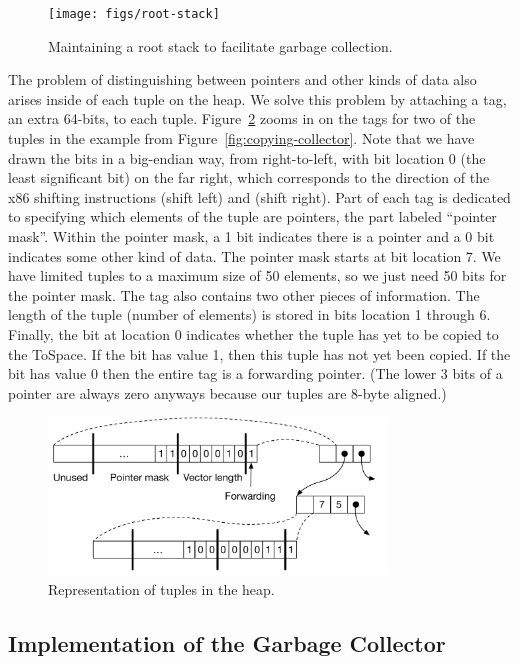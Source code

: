 \documentclass[11pt]{book}
\begin{document}
\begin{figure}[tbp]
\centering \texttt{[image: figs/root-stack]}
\caption{Maintaining a root stack to facilitate garbage collection.}
\label{fig:shadow-stack}
\end{figure}

The problem of distinguishing between pointers and other kinds of data
also arises inside of each tuple on the heap. We solve this problem by
attaching a tag, an extra 64-bits, to each
tuple. Figure~\ref{fig:tuple-rep} zooms in on the tags for two of the
tuples in the example from Figure~\ref{fig:copying-collector}. Note
that we have drawn the bits in a big-endian way, from right-to-left,
with bit location 0 (the least significant bit) on the far right,
which corresponds to the direction of the x86 shifting instructions
 (shift left) and  (shift right). Part of each tag
is dedicated to specifying which elements of the tuple are pointers,
the part labeled ``pointer mask''. Within the pointer mask, a 1 bit
indicates there is a pointer and a 0 bit indicates some other kind of
data. The pointer mask starts at bit location 7. We have limited
tuples to a maximum size of 50 elements, so we just need 50 bits for
the pointer mask. The tag also contains two other pieces of
information. The length of the tuple (number of elements) is stored in
bits location 1 through 6. Finally, the bit at location 0 indicates
whether the tuple has yet to be copied to the ToSpace.  If the bit has
value 1, then this tuple has not yet been copied.  If the bit has
value 0 then the entire tag is a forwarding pointer. (The lower 3 bits
of a pointer are always zero anyways because our tuples are 8-byte
aligned.)

\begin{figure}[tbp]
\centering \includegraphics[width=0.8\textwidth]{figs/tuple-rep}
\caption{Representation of tuples in the heap.}
\label{fig:tuple-rep}
\end{figure}

\subsection{Implementation of the Garbage Collector}
\label{sec:organize-gz}
\end{document}
